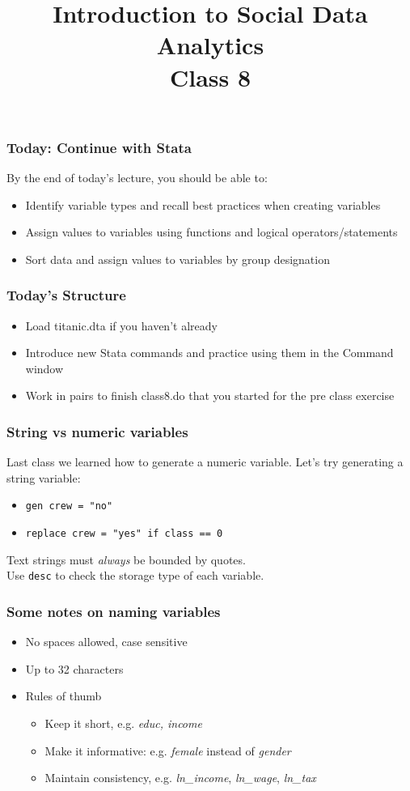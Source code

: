 \documentclass[11pt]{beamer}
\title[Class 8]{Introduction to Social Data Analytics \\
	\bigskip Class 8}
\author[]{}
\institute[UCSD]{}
\date{}
\begin{document}
\frame{\titlepage}

\begin{frame}
\frametitle{Today: Continue with Stata}
By the end of today's lecture, you should be able to:
\begin{itemize} \itemsep1em
	\item Identify variable types and recall best practices when creating variables
	\item Assign values to variables using functions and logical operators/statements
	\item Sort data and assign values to variables by group designation 
\end{itemize}
\end{frame}

\begin{frame}
\frametitle{Today's Structure}
\begin{itemize} \itemsep1em
	\item Load titanic.dta if you haven't already
	\item Introduce new Stata commands and practice using them in the Command window
	\item Work in pairs to finish class8.do that you started for the pre class exercise
\end{itemize}
\end{frame}

\begin{frame}
\frametitle{String vs numeric variables}
Last class we learned how to generate a numeric variable. Let's try generating a string variable:
\begin{itemize}
	\item \texttt{gen crew = "no"}
	\item \texttt{replace crew = "yes" if class == 0} \pause \bigskip
\end{itemize}
Text strings must \textit{always} be bounded by quotes. \\ \pause \bigskip
Use \texttt{desc} to check the storage type of each variable.
\end{frame}

\begin{frame}
\frametitle{Some notes on naming variables}
\begin{itemize} \itemsep1em
\item No spaces allowed, case sensitive
\item Up to 32 characters
\item Rules of thumb
\begin{itemize} \pause
\item Keep it short, e.g. \textit{educ, income}
\item Make it informative: e.g. \textit{female} instead of \textit{gender}
\item Maintain consistency, e.g. \textit{ln\_income}, \textit{ln\_wage}, \textit{ln\_tax}
\end{itemize}
\end{itemize}
\end{frame}
\end{document}
